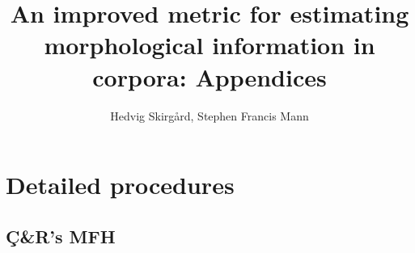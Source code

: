 \documentclass[USenglish]{article}
\author{Hedvig Skirgård, Stephen Francis Mann}
\title{An improved metric for estimating morphological information in corpora: Appendices}
\begin{document}
\date{}
\maketitle

\setcounter{tocdepth}{4}
\setcounter{secnumdepth}{4}

\tableofcontents

  \renewcommand{\thesection}{\Alph{section}} %
  \renewcommand{\thetable}{\Alph{table}} %
  \renewcommand{\thefigure}{\Alph{figure}} %
  \newpage
\section{Detailed procedures}
\subsection{Ç\&R's MFH}\label{sec:appendix_ccoltekin}
\end{document}

